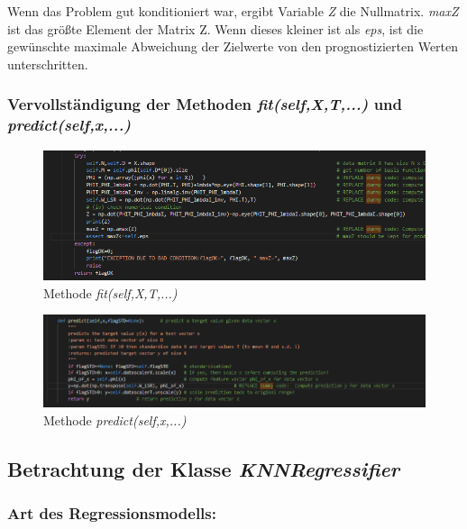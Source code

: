 \noindent
 \vspace{0px}
Wenn das Problem gut konditioniert war, ergibt Variable \textit{Z} die Nullmatrix. \textit{maxZ} ist das größte Element der Matrix Z.
Wenn dieses kleiner ist als \textit{eps}, ist die gewünschte maximale Abweichung der Zielwerte von den prognostizierten Werten unterschritten. 

\subsubsection{ Vervollständigung der Methoden \textit{fit(self,X,T,...)} und \textit{predict(self,x,...)} }

\begin{figure}[H]
    \centering
    \includegraphics[width=1\linewidth]{sections/aufgabe2c_fit.png}
    \caption{Methode \textit{fit(self,X,T,...)}}
\end{figure}

\begin{figure}[H]
    \centering
    \includegraphics[width=1\linewidth]{sections/aufgabe2c_predict.png}
    \caption{Methode \textit{predict(self,x,...)}}
\end{figure}

\subsection{
    Betrachtung der Klasse \textit{KNNRegressifier}
}

\subsubsection{ Art des Regressionsmodells: }

